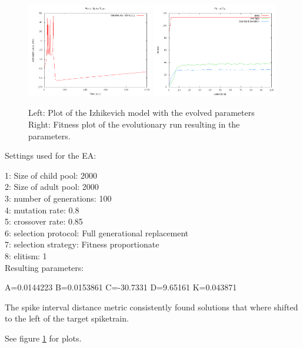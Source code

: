 \documentclass[11pt]{article}
\begin{document}
\begin{figure}
\begin{center}
\mbox{\includegraphics[width=0.49\textwidth]{images/2-res.png}}
\mbox{\includegraphics[width=0.49\textwidth]{images/2-fit.png}}
\end{center}
\caption{Left: Plot of the Izhikevich model with the evolved parameters\\
Right: Fitness plot of the evolutionary run resulting in the parameters.}
\label{fig:2}
\end{figure}

Settings used for the EA:

1: Size of child pool: 2000\\
2: Size of adult pool: 2000\\
3: number of generations: 100\\
4: mutation rate: 0.8\\
5: crossover rate: 0.85\\
6: selection protocol: Full generational replacement\\
7: selection strategy: Fitness proportionate\\
8: elitism: 1\\

Resulting parameters:

A=0.0144223 B=0.0153861 C=-30.7331 D=9.65161 K=0.043871

The spike interval distance metric consistently found solutions
that where shifted to the left of the target spiketrain.

See figure \ref{fig:2} for plots.
\end{document}
